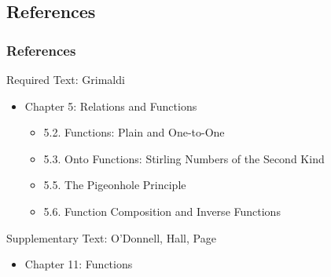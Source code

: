 \documentclass[dvipsnames]{beamer}
\begin{document}
\subsection*{References}

\begin{frame}
  \frametitle{References}

  \begin{block}{Required Text: Grimaldi}
    \begin{itemize}
      \item Chapter 5: Relations and Functions
      \begin{itemize}
        \item 5.2. \alert{Functions: Plain and One-to-One}
        \item 5.3. \alert{Onto Functions: Stirling Numbers of the Second Kind}
        \item 5.5. \alert{The Pigeonhole Principle}
        \item 5.6. \alert{Function Composition and Inverse Functions}
      \end{itemize}
    \end{itemize}
  \end{block}

  \begin{block}{Supplementary Text: O'Donnell, Hall, Page}
    \begin{itemize}
      \item Chapter 11: Functions
    \end{itemize}
  \end{block}
\end{frame}
\end{document}
